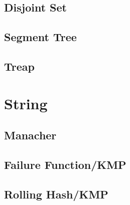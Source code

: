 	\subsection{Disjoint Set}
		
	\subsection{Segment Tree}
		
	\subsection{Treap}
		
\section{String}
	\subsection{Manacher}
		
	\subsection{Failure Function/KMP}
		
	\subsection{Rolling Hash/KMP}
		